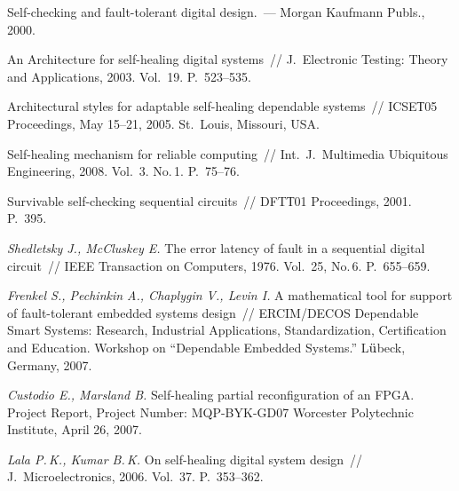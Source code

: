 \begin{multicols}{2}
{{\begin{thebibliography}{99}
Self-checking and fault-tolerant digital  design.~---
Morgan Kaufmann Publs., 2000.

An Architecture for self-healing digital systems~//
J.\ Electronic Testing: Theory and Applications, 2003.
Vol.~19. P.~523--535.

Architectural styles for adaptable self-healing dependable systems~//
ICSEТ05 Proceedings, May 15--21, 2005. St.\ Louis, Missouri, USA.

Self-healing mechanism for reliable computing~//
Int.\ J.\ Multimedia Ubiquitous Engineering,
2008. Vol.~3. No.\,1. P.~75--76.

Survivable self-checking sequential circuits~//
DFTТ01 Proceedings, 2001. P.~395.

{\it Shedletsky J., McCluskey E.}
The error latency of fault in a sequential digital circuit~//
IEEE Transaction on Computers, 1976. Vol.~25, No.\,6. P.~655--659.

{\it Frenkel S., Pechinkin A., Chaplygin V., Levin I.}
A mathematical tool for support of fault-tolerant
embedded systems design~//
ERCIM/DECOS Dependable Smart Systems: Research,
Industrial Applications, Standardization,
Certification and Education. Workshop on
``Dependable Embedded Systems.'' L$\ddot{\text u}$beck, Germany, 2007.

{\it Custodio E., Marsland B.}
Self-healing partial reconfiguration of an FPGA.
Project Report, Project Number: MQP-BYK-GD07
Worcester Polytechnic Institute, April 26, 2007.

{\it Lala P.\,K., Kumar B.\,K.}
On self-healing digital system design~//
J.\ Microelectronics, 2006.
Vol.~37. P.~353--362.

 \end{thebibliography}
}
}


\end{multicols}


\vspace*{-24pt}

\def\tit{ОЦЕНКА ВРЕМЕНИ САМОВОССТАНОВЛЕНИЯ В ЦИФРОВЫХ СИСТЕМАХ ПОСЛЕ СБОЕВ,
ВЫЗЫВАЕМЫХ ПЕРЕХОДНЫМИ ПОМЕХАМИ}

